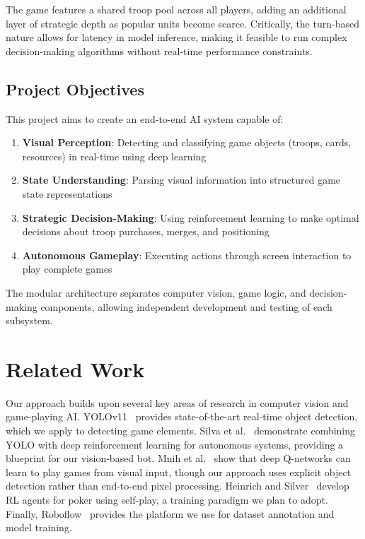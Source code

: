 \documentclass[12pt]{article}
\begin{document}
The game features a shared troop pool across all players, adding an additional layer of strategic depth as popular units become scarce. Critically, the turn-based nature allows for latency in model inference, making it feasible to run complex decision-making algorithms without real-time performance constraints.

\subsection{Project Objectives}

This project aims to create an end-to-end AI system capable of:

\begin{enumerate}
    \item \textbf{Visual Perception}: Detecting and classifying game objects (troops, cards, resources) in real-time using deep learning
    \item \textbf{State Understanding}: Parsing visual information into structured game state representations
    \item \textbf{Strategic Decision-Making}: Using reinforcement learning to make optimal decisions about troop purchases, merges, and positioning
    \item \textbf{Autonomous Gameplay}: Executing actions through screen interaction to play complete games
\end{enumerate}

The modular architecture separates computer vision, game logic, and decision-making components, allowing independent development and testing of each subsystem.

\section{Related Work}

Our approach builds upon several key areas of research in computer vision and game-playing AI. YOLOv11~\cite{yolov11} provides state-of-the-art real-time object detection, which we apply to detecting game elements. Silva et al.~\cite{yolo-drl-driving} demonstrate combining YOLO with deep reinforcement learning for autonomous systems, providing a blueprint for our vision-based bot. Mnih et al.~\cite{atari-drl} show that deep Q-networks can learn to play games from visual input, though our approach uses explicit object detection rather than end-to-end pixel processing. Heinrich and Silver~\cite{poker-drl} develop RL agents for poker using self-play, a training paradigm we plan to adopt. Finally, Roboflow~\cite{roboflow} provides the platform we use for dataset annotation and model training.
\end{document}
